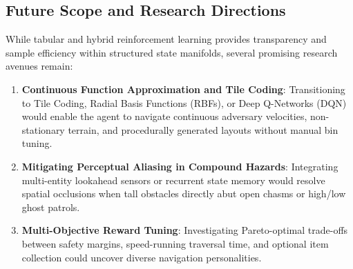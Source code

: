 \subsection{Future Scope and Research Directions}
While tabular and hybrid reinforcement learning provides transparency and sample efficiency within structured state manifolds, several promising research avenues remain:
\begin{enumerate}
    \item \textbf{Continuous Function Approximation and Tile Coding}: Transitioning to Tile Coding, Radial Basis Functions (RBFs), or Deep Q-Networks (DQN) would enable the agent to navigate continuous adversary velocities, non-stationary terrain, and procedurally generated layouts without manual bin tuning.
    \item \textbf{Mitigating Perceptual Aliasing in Compound Hazards}: Integrating multi-entity lookahead sensors or recurrent state memory would resolve spatial occlusions when tall obstacles directly abut open chasms or high/low ghost patrols.
    \item \textbf{Multi-Objective Reward Tuning}: Investigating Pareto-optimal trade-offs between safety margins, speed-running traversal time, and optional item collection could uncover diverse navigation personalities.
\end{enumerate}
